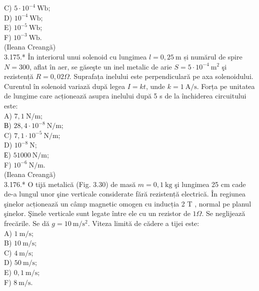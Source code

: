 \documentclass[10pt]{article}
\begin{document}
C) $5 \cdot 10^{-4} \mathrm{~Wb}$;\\
D) $10^{-4} \mathrm{~Wb}$;\\
E) $10^{-5} \mathrm{~Wb}$;\\
F) $10^{-3} \mathrm{~Wb}$.\\
(Ileana Creangă)\\
3.175.* În interiorul unui solenoid cu lungimea $l=0,25 \mathrm{~m}$ și numărul de spire $N=300$, aflat în aer, se găseşte un inel metalic de arie $S=5 \cdot 10^{-4} \mathrm{~m}^{2}$ şi rezistență $R=0,02 \Omega$. Suprafața inelului este perpendiculară pe axa solenoidului. Curentul în solenoid variază după legea $I=k t$, unde $k=1 \mathrm{~A} / \mathrm{s}$. Forța pe unitatea de lungime care acționează asupra inelului după 5 s de la închiderea circuitului este:\\
A) $7,1 \mathrm{~N} / \mathrm{m}$;\\
В) $28,4 \cdot 10^{-8} \mathrm{~N} / \mathrm{m}$;\\
C) $7,1 \cdot 10^{-5} \mathrm{~N} / \mathrm{m}$;\\
D) $10^{-8} \mathrm{~N}$;\\
Е) $51000 \mathrm{~N} / \mathrm{m}$;\\
F) $10^{-6} \mathrm{~N} / \mathrm{m}$.\\
(Ileana Creangă)\\
3.176.* O tijă metalică (Fig. 3.30) de masă $m=0,1 \mathrm{~kg}$ şi lungimea 25 cm cade de-a lungul unor şine verticale considerate fără rezistență electrică. În regiunea şinelor acționează un câmp magnetic omogen cu inducția 2 T , normal pe planul şinelor. Şinele verticale sunt legate între ele cu un rezistor de $1 \Omega$. Se neglijează frecările. Se dă $g=10 \mathrm{~m} / \mathrm{s}^{2}$. Viteza limită de cădere a tijei este:\\
A) $1 \mathrm{~m} / \mathrm{s}$;\\
B) $10 \mathrm{~m} / \mathrm{s}$;\\
C) $4 \mathrm{~m} / \mathrm{s}$;\\
D) $50 \mathrm{~m} / \mathrm{s}$;\\
E) $0,1 \mathrm{~m} / \mathrm{s}$;\\
F) $8 \mathrm{~m} / \mathrm{s}$.\\
\end{document}

